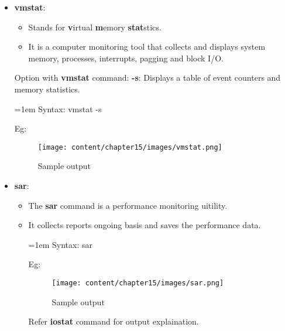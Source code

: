 \begin{flushleft}
\begin{itemize}
\begin{itemize}
	\end{itemize}
	\newpage
	\item \textbf{vmstat}: 
	\begin{itemize}
		\item Stands for \textbf{v}irtual \textbf{m}emory \textbf{stat}stics.
		\item It is a computer monitoring tool that collects and displays system memory, processes, interrupts, pagging and block I/O.
	\end{itemize}
	\bigskip
	Option with \textbf{vmstat} command:
	\newline
	\textbf{-s}: Displays a table of event counters and memory statistics.
	\newline
	\begin{tcolorbox}[breakable,notitle,boxrule=0pt,colback=pink,colframe=pink]
		\color{black}
		\font=1em
		Syntax: vmstat -s
		\font=4pt
	\end{tcolorbox}
	Eg:
	\begin{figure}[h!]
		\centering
		\texttt{[image: content/chapter15/images/vmstat.png]}
		\caption{Sample output}
		\label{fig:output3}
	\end{figure}

	\newpage
	\item \textbf{sar}: 
	\begin{itemize}
		\item The \textbf{sar} command is a performance monitoring uitility.
		\item It collects reports ongoing basis and saves the performance data.
		\begin{tcolorbox}[breakable,notitle,boxrule=0pt,colback=pink,colframe=pink]
			\color{black}
			\font=1em
			Syntax: sar
			\font=4pt
		\end{tcolorbox}
		Eg:
		\begin{figure}[h!]
			\centering
			\texttt{[image: content/chapter15/images/sar.png]}
			\caption{Sample output}
			\label{fig:output4}
		\end{figure}
		
		Refer \textbf{iostat} command for output explaination.	
			
	\end{itemize}
	
	
\end{itemize}

\end{flushleft}
\newpage


